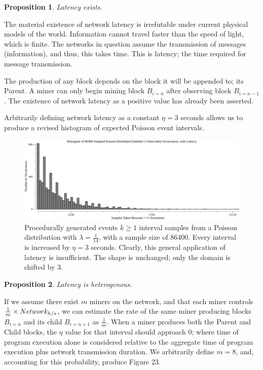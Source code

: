\documentclass[11pt]{article}
\theoremstyle{plain}
\newtheorem{proposition}{Proposition}[section]
\begin{document}
\vspace{5mm}
\begin{proposition}
  Latency exists.
\end{proposition}

The material existence of network latency is irrefutable under
current physical models of the world.
Information cannot travel faster than the speed of light, which is finite.
The networks in question assume the transmission of messages (information), and
thus, this takes time.
This is latency; the time required for message transmission.

The production of any block depends on the block it will be appended to; its
Parent.
A miner can only begin mining block $B_{i=n}$ after observing block $B_{i=n-1}$.
The existence of network latency as a positive value has already been asserted.

Arbitrarily defining network latency as a constant $\eta=3$ seconds allows us
to produce a revised histogram of expected Poisson event intervals.

\begin{figure}[tph]
    \centering
\includegraphics[width=1.0\textwidth]{go-block-step/out/vis_poisson_samples_eventintervals_latencynaive_hist.png}
    \caption{
      Procedurally generated events $k \geq 1$ interval samples from a Poisson distribution
with $\lambda = \frac{1}{14}$, with a sample size of 86400.
      Every interval is increased by $\eta=3$ seconds.
    Clearly, this general application of latency is insufficient.
    The shape is unchanged; only the domain is shifted by $3$.
    }
\end{figure}

\vspace{5mm}
\begin{proposition}
  Latency is heterogenous.
\end{proposition}

If we assume there exist $m$ miners on the network, and that each miner 
controls $\frac{1}{m} \times Network_{h/s}$, we can estimate the rate of the 
same miner producing blocks $B_{i=n}$ and its child $B_{i=n+1}$ as 
$\frac{1}{m}$.
When a miner produces both the Parent and Child blocks, the $\eta$ value for
that interval should approach $0$; where time of program execution alone is 
considered relative to the aggregate time of program execution plus network 
transmission duration.
We arbitrarily define $m=8$, and, accounting for this probability, produce 
Figure 23.
\end{document}
